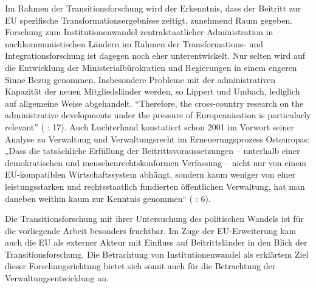 Im Rahmen der Transitionsforschung wird der Erkenntnis, dass der Beitritt zur EU spezifische Transformationsergebnisse zeitigt, zunehmend Raum gegeben. Forschung zum Institutionenwandel zentralstaatlicher Administration in nachkommunistischen Ländern im Rahmen der Transformations- und Integrationsforschung ist dagegen noch eher unterentwickelt. Nur selten wird auf die Entwicklung der Ministerialbürokratien und Regierungen in einem engeren Sinne Bezug genommen. Insbesondere Probleme mit der administrativen Kapazität der neuen Mitgliedsländer werden, so Lippert und Umbach, lediglich auf allgemeine Weise abgehandelt. “Therefore, the cross-country research on the administrative developments under the pressure of Europeanisation is particularly relevant” (\cite{lipumb05} : 17). Auch Luchterhand konstatiert schon 2001 im Vorwort seiner Analyse zu Verwaltung und Verwaltungsrecht im Erneuerungsprozess Osteuropas: „Dass die tatsächliche Erfüllung der Beitrittsvoraussetzungen – unterhalb einer demokratischen und menschenrechtskonformen Verfassung – nicht nur von einem EU-kompatiblen Wirtschaftssystem abhängt, sondern kaum weniger von einer leistungsstarken und rechtsstaatlich fundierten öffentlichen Verwaltung, hat man daneben weithin kaum zur Kenntnis genommen“ (\cite{lucht} : 6).\par
Die Transitionsforschung mit ihrer Untersuchung des politischen Wandels ist für die vorliegende Arbeit besonders fruchtbar. Im Zuge der EU-Erweiterung kam auch die EU als externer Akteur mit Einfluss auf Beitrittsländer in den Blick der Transitionsforschung. Die Betrachtung von Institutionenwandel als erklärtem Ziel dieser Forschungsrichtung bietet sich somit auch für die Betrachtung der Verwaltungsentwicklung an. 
